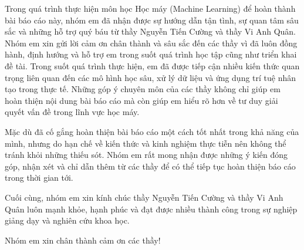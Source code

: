 \documentclass[
12pt,
oneside,
english,
doublespacing,
nolistspacing,
liststotoc,
parskip,
headsepline,
chapterinoneline,
]{HUSdissertation}
\author{NHÓM 11} 			%
\begin{document}
\lstset{style=codeC}	%

\frontmatter 			%

\pagestyle{plain} 


%












\begin{acknowledgements}
	\addchaptertocentry{\acknowledgementname}
	\thispagestyle{empty}

Trong quá trình thực hiện môn học Học máy (Machine Learning) để hoàn thành bài báo cáo này, nhóm em đã nhận được sự hướng dẫn tận tình, sự quan tâm sâu sắc và những hỗ trợ quý báu từ thầy Nguyễn Tiến Cường và thầy Vi Anh Quân. Nhóm em xin gửi lời cảm ơn chân thành và sâu sắc đến các thầy vì đã luôn đồng hành, định hướng và hỗ trợ em trong suốt quá trình học tập cũng như triển khai đề tài. Trong suốt quá trình thực hiện, em đã được tiếp cận nhiều kiến thức quan trọng liên quan đến các mô hình học sâu, xử lý dữ liệu và ứng dụng trí tuệ nhân tạo trong thực tế. Những góp ý chuyên môn của các thầy không chỉ giúp em hoàn thiện nội dung bài báo cáo mà còn giúp em hiểu rõ hơn về tư duy giải quyết vấn đề trong lĩnh vực học máy.

Mặc dù đã cố gắng hoàn thiện bài báo cáo một cách tốt nhất trong khả năng của mình, nhưng do hạn chế về kiến thức và kinh nghiệm thực tiễn nên không thể tránh khỏi những thiếu sót. Nhóm em rất mong nhận được những ý kiến đóng góp, nhận xét và chỉ dẫn thêm từ các thầy để có thể tiếp tục hoàn thiện báo cáo trong thời gian tới.

Cuối cùng, nhóm em xin kính chúc thầy Nguyễn Tiến Cường và thầy Vi Anh Quân luôn mạnh khỏe, hạnh phúc và đạt được nhiều thành công trong sự nghiệp giảng dạy và nghiên cứu khoa học.

Nhóm em xin chân thành cảm ơn các thầy!
\end{acknowledgements}
\end{document}
